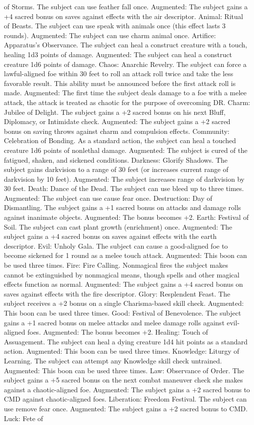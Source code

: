 of Storms. The subject can use feather fall once. Augmented: The subject gains a +4 sacred bonus on saves against effects with the air descriptor.  Animal: Ritual of Beasts. The subject can use speak with animals once (this effect lasts 3 rounds). Augmented: The subject can use charm animal once.  Artifice: Apparatus's Observance. The subject can heal a construct creature with a touch, healing 1d3 points of damage. Augmented: The subject can heal a construct creature 1d6 points of damage.  Chaos: Anarchic Revelry. The subject can force a lawful-aligned foe within 30 feet to roll an attack roll twice and take the less favorable result. This ability must be announced before the first attack roll is made. Augmented: The first time the subject deals damage to a foe with a melee attack, the attack is treated as chaotic for the purpose of overcoming DR.  Charm: Jubilee of Delight. The subject gains a +2 sacred bonus on his next Bluff, Diplomacy, or Intimidate check. Augmented: The subject gains a +2 sacred bonus on saving throws against charm and compulsion effects.  Community: Celebration of Bonding. As a standard action, the subject can heal a touched creature 1d6 points of nonlethal damage. Augmented: The subject is cured of the fatigued, shaken, and sickened conditions.  Darkness: Glorify Shadows. The subject gains darkvision to a range of 30 feet (or increases current range of darkvision by 10 feet). Augmented: The subject increases range of darkvision by 30 feet.  Death: Dance of the Dead. The subject can use bleed up to three times. Augmented: The subject can use cause fear once.  Destruction: Day of Dismantling. The subject gains a +1 sacred bonus on attacks and damage rolls against inanimate objects. Augmented: The bonus becomes +2.  Earth: Festival of Soil. The subject can cast plant growth (enrichment) once. Augmented: The subject gains a +4 sacred bonus on saves against effects with the earth descriptor.  Evil: Unholy Gala. The subject can cause a good-aligned foe to become sickened for 1 round as a melee touch attack. Augmented: This boon can be used three times.  Fire: Fire Calling. Nonmagical fires the subject makes cannot be extinguished by nonmagical means, though spells and other magical effects function as normal. Augmented: The subject gains a +4 sacred bonus on saves against effects with the fire descriptor.  Glory: Resplendent Feast. The subject receives a +2 bonus on a single Charisma-based skill check. Augmented: This boon can be used three times.  Good: Festival of Benevolence. The subject gains a +1 sacred bonus on melee attacks and melee damage rolls against evil-aligned foes. Augmented: The bonus becomes +2.  Healing: Touch of Assuagement. The subject can heal a dying creature 1d4 hit points as a standard action. Augmented: This boon can be used three times.  Knowledge: Liturgy of Learning. The subject can attempt any Knowledge skill check untrained. Augmented: This boon can be used three times.  Law: Observance of Order. The subject gains a +5 sacred bonus on the next combat maneuver check she makes against a chaotic-aligned foe. Augmented: The subject gains a +2 sacred bonus to CMD against chaotic-aligned foes.  Liberation: Freedom Festival. The subject can use remove fear once. Augmented: The subject gains a +2 sacred bonus to CMD.  Luck: Fete of 